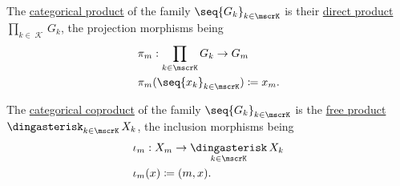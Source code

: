 \begin{proposition}\label{thm:group_categorical_limits}
  \hfill
  \begin{thmenum}
     The \hyperref[def:discrete_category_limits]{categorical product} of the family \( \seq{ G_k }_{k \in \mscrK} \) is their \hyperref[def:group_direct_product]{direct product} \( \prod_{k \in \mscrK} G_k \), the projection morphisms being
    \begin{equation*}
      \begin{aligned}
        &\pi_m: \prod_{k \in \mscrK} G_k \to G_m \\
        &\pi_m(\seq{ x_k }_{k \in \mscrK}) \coloneqq x_m.
      \end{aligned}
    \end{equation*}

     The \hyperref[def:discrete_category_limits]{categorical coproduct} of the family \( \seq{ G_k }_{k \in \mscrK} \) is the \hyperref[def:group_free_product]{free product} \( \Ast_{k \in \mscrK} X_k \), the inclusion morphisms being
    \begin{equation*}
      \begin{aligned}
         &\iota_m: X_m \to \Ast_{k \in \mscrK} X_k \\
         &\iota_m(x) \coloneqq (m, x).
      \end{aligned}
    \end{equation*}
  \end{thmenum}
\end{proposition}
